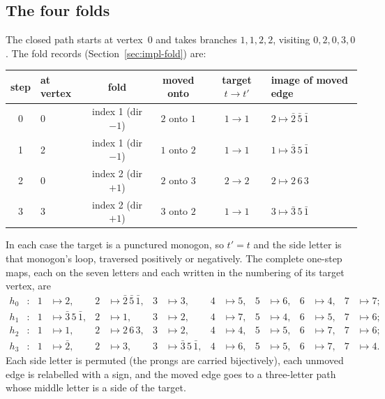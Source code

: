 \documentclass[12pt]{amsart}
\newcommand{\anti}[1]{\bar{#1}}          %
\theoremstyle{plain}
\theoremstyle{definition}
\begin{document}
\subsection{The four folds}
The closed path starts at vertex~0 and takes branches $1,1,2,2$, visiting
$0,2,0,3,0$.  The fold records (Section~\ref{sec:impl-fold}) are:
\begin{center}
  \small
  \begin{tabular}{@{}clcccl@{}}
    \toprule
    step & at vertex & fold & moved onto & target $t\to t'$ & image of moved edge \\
    \midrule
    0 & 0 & index 1 (dir $-1$) & $2$ onto $1$ & $1\to1$ & $2\mapsto \anti2\,\anti5\,\anti1$ \\
    1 & 2 & index 1 (dir $-1$) & $1$ onto $2$ & $1\to1$ & $1\mapsto \anti3\,5\,\anti1$ \\
    2 & 0 & index 2 (dir $+1$) & $2$ onto $3$ & $2\to2$ & $2\mapsto 2\,6\,3$ \\
    3 & 3 & index 2 (dir $+1$) & $3$ onto $2$ & $1\to1$ & $3\mapsto \anti3\,5\,\anti1$ \\
    \bottomrule
  \end{tabular}
\end{center}
In each case the target is a punctured monogon, so $t'=t$ and the side
letter is that monogon's loop, traversed positively or negatively.  The
complete one-step maps, each on the seven letters and each written in
the numbering of its target vertex, are
\begin{align*}
  h_0&: & 1&\mapsto 2, & 2&\mapsto \anti2\,\anti5\,\anti1, & 3&\mapsto 3,
       & 4&\mapsto 5, & 5&\mapsto 6, & 6&\mapsto 4, & 7&\mapsto 7;\\
  h_1&: & 1&\mapsto \anti3\,5\,\anti1, & 2&\mapsto 1, & 3&\mapsto 2,
       & 4&\mapsto 7, & 5&\mapsto 4, & 6&\mapsto 5, & 7&\mapsto 6;\\
  h_2&: & 1&\mapsto 1, & 2&\mapsto 2\,6\,3, & 3&\mapsto 2,
       & 4&\mapsto 4, & 5&\mapsto 5, & 6&\mapsto 7, & 7&\mapsto 6;\\
  h_3&: & 1&\mapsto \anti2, & 2&\mapsto 3, & 3&\mapsto \anti3\,5\,\anti1,
       & 4&\mapsto 6, & 5&\mapsto 5, & 6&\mapsto 7, & 7&\mapsto 4.
\end{align*}
Each side letter is permuted (the prongs are carried bijectively), each
unmoved edge is relabelled with a sign, and the moved edge goes to a
three-letter path whose middle letter is a side of the target.
\end{document}
